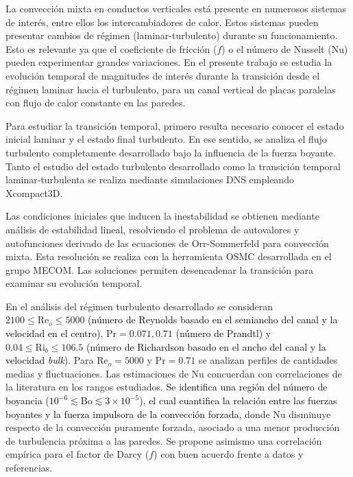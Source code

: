 \begin{resumen}%

La convección mixta en conductos verticales está presente en numerosos sistemas de interés, entre ellos los intercambiadores de calor. Estos sistemas pueden presentar cambios de régimen (laminar-turbulento) durante su funcionamiento. Esto es relevante ya que el coeficiente de fricción ($f$) o el número de Nusselt (Nu) pueden experimentar grandes variaciones. En el presente trabajo se estudia la evolución temporal de magnitudes de interés durante la transición desde el régimen laminar hacia el turbulento, para un canal vertical de placas paralelas con flujo de calor constante en las paredes.

Para estudiar la transición temporal, primero resulta necesario conocer el estado inicial laminar y el estado final turbulento. En ese sentido, se analiza el flujo turbulento completamente desarrollado bajo la influencia de la fuerza boyante. Tanto el estudio del estado turbulento desarrollado como la transición temporal laminar-turbulenta se realiza mediante simulaciones DNS empleando Xcompact3D. 

Las condiciones iniciales que inducen la inestabilidad se obtienen mediante análisis de estabilidad lineal, resolviendo el problema de autovalores y autofunciones derivado de las ecuaciones de Orr-Sommerfeld para convección mixta. Esta resolución se realiza con la herramienta OSMC desarrollada en el grupo MECOM. Las soluciones permiten desencadenar la transición para examinar su evolución temporal. 


En el análisis del régimen turbulento desarrollado se consideran $2100 \leq \mathrm{Re}_o \leq 5000$ \textcolor{black}{(número de Reynolds basado en el semiancho del canal y la velocidad en el centro)}, \linebreak $\mathrm{Pr}=0\text{.}071,0\text{.}71$ \textcolor{black}{(número de Prandtl)} y $0\text{.}04 \leq \mathrm{Ri}_b \leq 106\text{.}5$  \textcolor{black}{(número de \linebreak Richardson  basado en el ancho del canal y la velocidad \textit{bulk})}. Para $\mathrm{Re}_o=5000$ y $\mathrm{Pr}=0\text{.}71$ se  analizan perfiles de cantidades medias y fluctuaciones. Las estimaciones de Nu  concuerdan con correlaciones de la literatura en los rangos estudiados. \textcolor{black}{Se identifica una región del número de boyancia ($10^{-6} \lesssim \text{Bo} \lesssim 3 \times 10^{-5}$), el cual cuantifica la relación entre las fuerzas boyantes y la fuerza impulsora de la convección forzada,} donde Nu disminuye respecto de la convección puramente forzada, asociado a una menor producción de turbulencia próxima a las paredes. Se propone asimismo una correlación empírica para el factor de Darcy ($f$) con buen acuerdo frente a datos y referencias.


\end{resumen}
